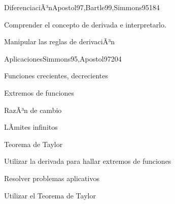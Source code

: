 \begin{syllabus}
\begin{unit}{DiferenciaciÃ³n}{Apostol97,Bartle99,Simmons95}{18}{4}
   \begin{learningoutcomes}
      \item Comprender el concepto de derivada e interpretarlo.
      \item Manipular las reglas de derivaciÃ³n
      \end{learningoutcomes}
\end{unit}

\begin{unit}{Aplicaciones}{Simmons95,Apostol97}{20}{4}
   \begin{topics}
      \item Funciones crecientes, decrecientes
      \item Extremos de funciones
      \item RazÃ³n de cambio
      \item LÃ­mites infinitos
      \item Teorema de Taylor
   \end{topics}

   \begin{learningoutcomes}
      \item Utilizar la derivada para hallar extremos de funciones
      \item Resolver problemas aplicativos
      \item Utilizar el Teorema de Taylor
      \end{learningoutcomes}
\end{unit}



\begin{coursebibliography}
\end{coursebibliography}

\end{syllabus}
